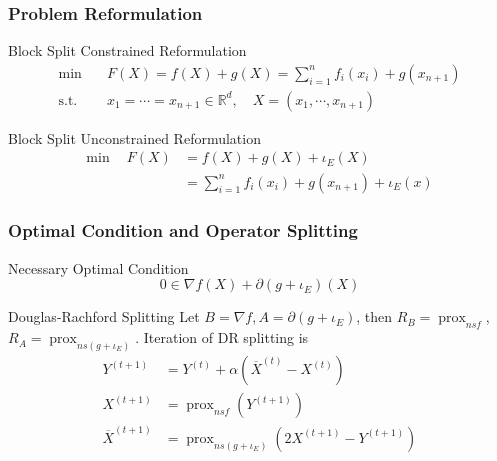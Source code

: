 
\begin{frame}
\frametitle{Problem Reformulation}

\begin{block}{Block Split Constrained Reformulation}
\ 
\vspace{-1.3em}
\begin{align*}
    \text{min} & \quad F(X) = f(X) + g(X) = \sum_{i=1}^n f_i(x_i) + g(x_{n+1}) \\
    \text{s.t.} & \quad x_1 = \cdots = x_{n+1} \in \mathbb{R}^d, \quad X = (x_1, \cdots, x_{n+1})
\end{align*}
\end{block}

\begin{block}{Block Split Unconstrained Reformulation}
\ 
\vspace{-1.3em}
\begin{align*}
    \text{min} \ \quad F(X) & = f(X) + g(X) + \iota_E(X) \\
    & = \sum_{i=1}^n f_i(x_i) + g(x_{n+1}) + \iota_E(x)
\end{align*}
\end{block}

\end{frame}


\begin{frame}
\frametitle{Optimal Condition and Operator Splitting}

\begin{block}{Necessary Optimal Condition}
\ 
\vspace{-1.3em}
$$0 \in \nabla f(X) + \partial (g + \iota_E)(X)$$
\end{block}

\begin{block}{Douglas-Rachford Splitting}
Let $B = \nabla f, A = \partial (g + \iota_E)$, then $R_B = \operatorname{prox}_{nsf}$, $R_A = \operatorname{prox}_{ns(g + \iota_E)}$. Iteration of DR splitting is
\begin{align*}
Y^{(t+1)} & = Y^{(t)} + \alpha (\overline{X}^{(t)} - X^{(t)}) \\
X^{(t+1)} & = \operatorname{prox}_{nsf}(Y^{(t+1)}) \\
\overline{X}^{(t+1)} & = \operatorname{prox}_{ns(g + \iota_E)}(2X^{(t+1)} - Y^{(t+1)})
\end{align*}
\end{block}

\end{frame}

